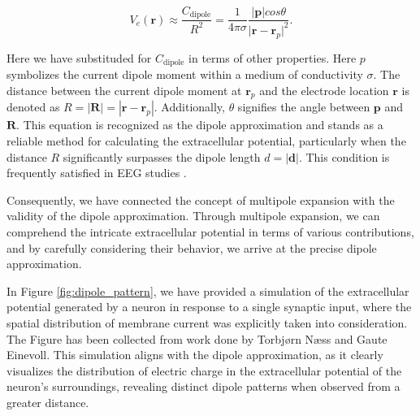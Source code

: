 \documentclass[a4paper, UKenglish, 11pt]{uiomaster}
\begin{document}
\begin{equation}
V_e(\textbf{r}) \approx \frac{C_{\text{dipole}}}{R^2} = \frac{1}{4\pi\sigma}\frac{|\textbf{p}| cos \theta}{\lvert\textbf{r}-\textbf{r}_p\rvert^2}.
\label{eq:extracellular_potential_approximation}
\end{equation}

Here we have substituded for $C_\text{dipole}$ in terms of other properties. Here $p$ symbolizes the current dipole moment within a medium of conductivity $\sigma$. The distance between the current dipole moment at $\textbf{r}_p$ and the electrode location $\textbf{r}$ is denoted as $R = |\textbf{R}| = |\textbf{r} - \textbf{r}_p|$. Additionally, $\theta$ signifies the angle between $\textbf{p}$ and $\textbf{R}$. This equation is recognized as the dipole approximation and stands as a reliable method for calculating the extracellular potential, particularly when the distance $R$ significantly surpasses the dipole length $d=|\textbf{d}|$. This condition is frequently satisfied in EEG studies \cite{naess2021biophysically}.

Consequently, we have connected the concept of multipole expansion with the validity of the dipole approximation. Through multipole expansion, we can comprehend the intricate extracellular potential in terms of various contributions, and by carefully considering their behavior, we arrive at the precise dipole approximation.

In Figure \ref{fig:dipole_pattern}, we have provided a simulation of the extracellular potential generated by a neuron in response to a single synaptic input, where the spatial distribution of membrane current was explicitly taken into consideration. The Figure has been collected from work done by Torbjørn Næss and Gaute Einevoll. This simulation aligns with the dipole approximation, as it clearly visualizes the distribution of electric charge in the extracellular potential of the neuron's surroundings, revealing distinct dipole patterns when observed from a greater distance.
\end{document}

